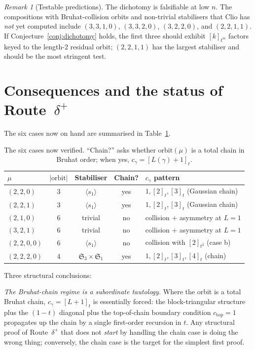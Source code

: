 \documentclass[11pt]{article}
\theoremstyle{definition}
\theoremstyle{remark}
\newtheorem{remark}[theorem]{Remark}
\newcommand{\qint}[1]{[#1]_t}
\begin{document}
\begin{remark}[Testable predictions]
The dichotomy is falsifiable at low $n$. The compositions with
Bruhat-collision orbits and non-trivial stabilisers that Clio has
\emph{not} yet computed include $(3,3,1,0)$, $(3,3,2,0)$,
$(3,2,2,0)$, and $(2,2,1,1)$. If Conjecture~\ref{conj:dichotomy}
holds, the first three should exhibit $[k]_{t^m}$ factors keyed
to the length-$2$ residual orbit; $(2,2,1,1)$ has the largest
stabiliser and should be the most stringent test.
\end{remark}

\section{Consequences and the status of Route~$\delta^+$}

The six cases now on hand are summarised in Table~\ref{tab:six}.

\begin{table}[h]
\centering
\renewcommand{\arraystretch}{1.3}
\begin{tabular}{lcccl}
\toprule
$\mu$ & $|\mathrm{orbit}|$ & Stabiliser & Chain? &
     $c_\gamma$ pattern \\
\midrule
$(2,2,0)$    & $3$ & $\langle s_1\rangle$ & yes &
     $1, \qint{2}, \qint{3}$ (Gaussian chain) \\
$(2,2,1)$    & $3$ & $\langle s_1\rangle$ & yes &
     $1, \qint{2}, \qint{3}$ (Gaussian chain) \\
$(2,1,0)$    & $6$ & trivial & no &
     collision + asymmetry at $L=1$ \\
$(3,2,1)$    & $6$ & trivial & no &
     collision + asymmetry at $L=1$ \\
$(2,2,0,0)$  & $6$ & $\langle s_1\rangle$ & no &
     collision with $[2]_{t^2}$ (case b) \\
$(2,2,2,0)$  & $4$ & $\mathfrak{S}_3 \times \mathfrak{S}_1$ & yes &
     $1, \qint{2}, \qint{3}, \qint{4}$ (chain) \\
\bottomrule
\end{tabular}
\caption{The six cases now verified. ``Chain?'' asks whether
$\mathrm{orbit}(\mu)$ is a total chain in Bruhat order; when yes,
$c_\gamma = \qint{L(\gamma)+1}$.}
\label{tab:six}
\end{table}

Three structural conclusions:

\emph{The Bruhat-chain regime is a subordinate tautology.} Where
the orbit is a total Bruhat chain, $c_\gamma = \qint{L+1}$ is
essentially forced: the block-triangular structure plus the
$(1-t)$ diagonal plus the top-of-chain boundary condition
$c_{\text{top}} = 1$ propagates up the chain by a single first-order
recursion in $t$. Any structural proof of Route~$\delta^+$ that
does not \emph{start} by handling the chain case is doing the wrong
thing; conversely, the chain case is the target for the simplest
first proof.
\end{document}
